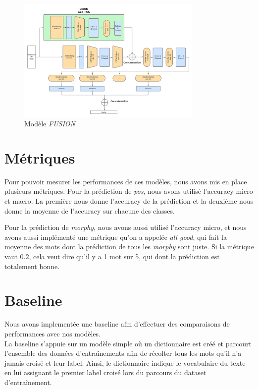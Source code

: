 \documentclass[a4paper]{article}
\begin{document}
\begin{figure}[!ht]
    \centering
    \includegraphics[width=0.8\textwidth]{get_morphy_fusion.png}
    \caption{Modèle \textit{FUSION}}
    \label{fig: model fusion}
\end{figure}


\section{Métriques}

Pour pouvoir mesurer les performances de ces modèles, nous avons mis en place plusieurs métriques. Pour la prédiction de 
\textit{pos}, nous avons utilisé l'accuracy micro et macro. La première nous donne l'accuracy de la prédiction et la deuxième
nous donne la moyenne de l'accuracy sur chacune des classes. 

Pour la prédiction de \textit{morphy}, nous avons aussi utilisé l'accuracy micro, et nous avons aussi implémenté une 
métrique qu'on a appelée \textit{all good}, qui fait la moyenne des mots dont la prédiction de tous les \textit{morphy}
sont juste. Si la métrique vaut $0.2$, cela veut dire qu'il y a 1 mot sur 5, qui dont la prédiction est totalement bonne.

\section{Baseline}

Nous avons implementée une baseline afin d'effectuer des comparaisons de performances avec nos modèles. \\

La baseline s'appuie sur un modèle simple où un dictionnaire est créé et parcourt l'ensemble des données d'entraînements afin de récolter tous les mots qu'il n'a jamais croisé et leur label. Ainsi, le dictionnaire indique le vocabulaire du texte en lui assignant le premier label croisé lors du parcours du dataset d'entraînement. \\
\end{document}

